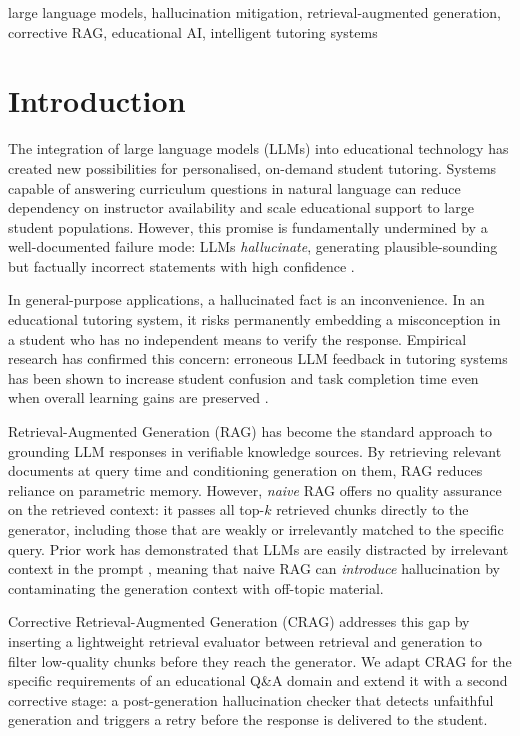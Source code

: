 \documentclass[conference]{IEEEtran}
\begin{document}
\begin{IEEEkeywords}
large language models, hallucination mitigation, retrieval-augmented
generation, corrective RAG, educational AI, intelligent tutoring systems
\end{IEEEkeywords}

\section{Introduction}
\label{sec:intro}

The integration of large language models (LLMs) into educational
technology has created new possibilities for personalised, on-demand
student tutoring.
Systems capable of answering curriculum questions in natural language
can reduce dependency on instructor availability and scale educational
support to large student populations.
However, this promise is fundamentally undermined by a well-documented
failure mode: LLMs \emph{hallucinate}, generating plausible-sounding
but factually incorrect statements with high confidence
\cite{ji2023survey,huang2025survey}.

In general-purpose applications, a hallucinated fact is an
inconvenience.
In an educational tutoring system, it risks permanently embedding a
misconception in a student who has no independent means to verify
the response.
Empirical research has confirmed this concern: erroneous LLM feedback
in tutoring systems has been shown to increase student confusion and
task completion time even when overall learning gains are preserved
\cite{steinbach2025hallucinate}.

Retrieval-Augmented Generation (RAG) \cite{lewis2020rag} has become
the standard approach to grounding LLM responses in verifiable
knowledge sources.
By retrieving relevant documents at query time and conditioning
generation on them, RAG reduces reliance on parametric memory.
However, \emph{naive} RAG offers no quality assurance on the retrieved
context: it passes all top-$k$ retrieved chunks directly to the
generator, including those that are weakly or irrelevantly matched to
the specific query.
Prior work has demonstrated that LLMs are easily distracted by
irrelevant context in the prompt \cite{shi2023distracted}, meaning
that naive RAG can \emph{introduce} hallucination by contaminating
the generation context with off-topic material.

Corrective Retrieval-Augmented Generation (CRAG)
\cite{yan2024crag} addresses this gap by inserting a lightweight
retrieval evaluator between retrieval and generation to filter
low-quality chunks before they reach the generator.
We adapt CRAG for the specific requirements of an educational Q\&A
domain and extend it with a second corrective stage: a
post-generation hallucination checker that detects unfaithful
generation and triggers a retry before the response is delivered to
the student.
\end{document}
